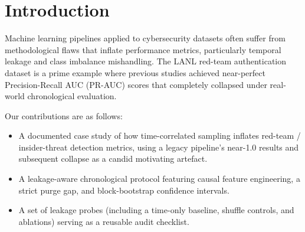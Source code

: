 \section{Introduction}
Machine learning pipelines applied to cybersecurity datasets often suffer from methodological flaws that inflate performance metrics, particularly temporal leakage and class imbalance mishandling. The LANL red-team authentication dataset is a prime example where previous studies achieved near-perfect Precision-Recall AUC (PR-AUC) scores that completely collapsed under real-world chronological evaluation.

Our contributions are as follows:
\begin{itemize}
    \item A documented case study of how time-correlated sampling inflates red-team / insider-threat detection metrics, using a legacy pipeline's near-1.0 results and subsequent collapse as a candid motivating artefact.
    \item A leakage-aware chronological protocol featuring causal feature engineering, a strict purge gap, and block-bootstrap confidence intervals.
    \item A set of leakage probes (including a time-only baseline, shuffle controls, and ablations) serving as a reusable audit checklist.
\end{itemize}
